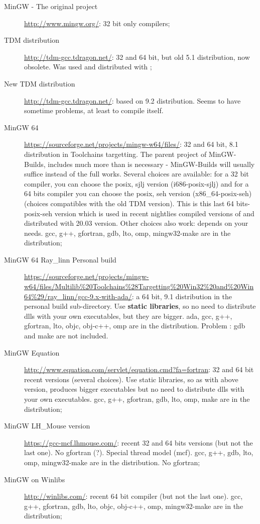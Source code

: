 \begin{description}
\item[MinGW - The original project] \url{http://www.mingw.org/}: 32 bit only compilers;
\item[TDM distribution]\url{http://tdm-gcc.tdragon.net/}: 32 and 64 bit, but old 5.1 distribution, now obsolete. Was used and distributed with ;
\item[New TDM distribution]\url{http://tdm-gcc.tdragon.net/}: based on 9.2 distribution. Seems to have sometime problems, at least to compile \codeblocks itself.
\item[MinGW 64] \url{https://sourceforge.net/projects/mingw-w64/files/}: 32 and 64 bit, 8.1 distribution in Toolchains targetting. The parent project of MinGW-Builds, includes much more than is necessary - MinGW-Builds will usually suffice instead of the full works. Several choices are available: for a 32 bit compiler, you can choose the posix, sjlj version (i686-posix-sjlj) and for a 64 bits compiler you can choose the posix, seh version (x86\_64-posix-seh) (choices compatibles with the old TDM version). This is this last 64 bits-posix-seh version which is used in recent nightlies compiled versions of \codeblocks and distributed with 20.03 version. Other choices also work: depends on your needs. gcc, g++, gfortran, gdb, lto, omp, mingw32-make are in the distribution;
\item[MinGW 64 Ray\_linn Personal build] \url{https://sourceforge.net/projects/mingw-w64/files/Multilib%20Toolchains%28Targetting%20Win32%20and%20Win64%29/ray_linn/gcc-9.x-with-ada/}: a 64 bit, 9.1 distribution in the personal build sub-directory. Use \textbf{static libraries}, so no need to distribute dlls with your own executables, but they are bigger. ada, gcc, g++, gfortran, lto, objc, obj-c++, omp are in the distribution. Problem : gdb and make are not included.
\item[MinGW Equation] \url{http://www.equation.com/servlet/equation.cmd?fa=fortran}: 32 and 64 bit recent versions (several choices). Use static libraries, so as with above version, produces bigger executables but no need to distribute dlls with your own executables.  gcc, g++, gfortran, gdb, lto, omp, make are in the distribution;
\item[MinGW LH\_Mouse version] \url{https://gcc-mcf.lhmouse.com/}: recent 32 and 64 bits versions (but not the last one). No gfortran (?). Special thread model (mcf).  gcc, g++, gdb, lto, omp, mingw32-make are in the distribution. No gfortran;
\item[MinGW on Winlibs] \url{http://winlibs.com/}: recent 64 bit compiler (but not the last one). gcc, g++, gfortran, gdb, lto, objc, obj-c++, omp, mingw32-make are in the distribution;

\end{description}

